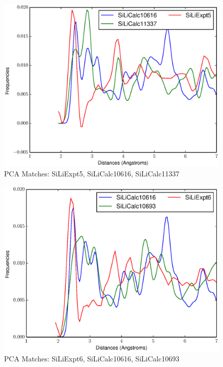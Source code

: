 \documentclass[12pt,letterpaper]{article}
\begin{document}
\begin{figure}[ht]
\begin{center}
\includegraphics[scale=0.8]{figs/PC128MatchSiLiExpt5-SiLiCalc10616-SiLiCalc11337.eps}
\caption{PCA Matches: SiLiExpt5, SiLiCalc10616, SiLiCalc11337}
\end{center}
\end{figure}

\begin{figure}[ht]
\begin{center}
\includegraphics[scale=0.8]{figs/PC128MatchSiLiExpt6-SiLiCalc10616-SiLiCalc10693.eps}
\caption{PCA Matches: SiLiExpt6, SiLiCalc10616, SiLiCalc10693}
\end{center}
\end{figure}
\end{document}
